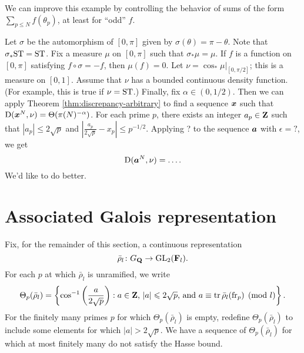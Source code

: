 We can improve this example by controlling the behavior of sums of the form 
$\sum_{p\leqslant N} f(\theta_p)$, at least for ``odd'' $f$. 

Let $\sigma$ be the automorphism of $[0,\pi]$ given by 
$\sigma(\theta) = \pi-\theta$. Note that $\sigma_\ast \mathrm{ST} = \mathrm{ST}$. 
Fix a measure $\mu$ on $[0,\pi]$ such that $\sigma_\ast \mu = \mu$. If $f$ is a 
function on $[0,\pi]$ satisfying $f\circ \sigma = - f$, then $\mu(f) = 0$. Let 
$\nu = \cos_\ast \left. \mu\right|_{[0,\pi/2]}$; this is a measure on $[0,1]$. 
Assume that $\nu$ has a bounded continuous density function. (For example, this 
is true if $\nu = \mathrm{ST}$.) Finally, fix $\alpha\in (0,1/2)$. Then we can apply 
Theorem \ref{thm:discrepancy-arbitrary} to find a sequence ${\boldsymbol x}$ such that 
$\operatorname{D}({\boldsymbol x}^N,\nu) = \Theta(\pi(N)^{-\alpha})$. For each prime $p$, there 
exists an integer $a_p\in \mathbf{Z}$ such that $|a_p| \leqslant 2\sqrt p$ and 
$\left| \frac{a_p}{2\sqrt p} - x_p\right| \leqslant p^{-1/2}$. Applying 
? to the sequence ${\boldsymbol a}$ with $\epsilon = ?$, we get 
\[
	\operatorname{D}({\boldsymbol a}^N,\nu) = \ldots .
\]
We'd like to do better. 





\section{Associated Galois representation}



Fix, for the remainder of this section, a continuous representation 
\[
	\bar\rho_l \colon G_{\mathbf{Q}} \to \operatorname{GL}_2(\mathbf{F}_l) .
\]
For each $p$ at which $\bar\rho_l$ is unramified, we write 
\[
	\Theta_p(\bar\rho_l) = \left\{\cos^{-1}\left(\frac{a}{2\sqrt p}\right) : a\in \mathbf{Z}\text{, }|a|\leqslant 2\sqrt p\text{, and }a\equiv \operatorname{tr}\bar\rho_l(\mathrm{fr}_p)\pmod l\right\} .
\]
For the finitely many primes $p$ for which $\Theta_p(\bar\rho_l)$ is empty, 
redefine $\Theta_p(\bar\rho_l)$ to include some elements for which 
$|a|>2\sqrt p$. We have a sequence of $\Theta_p(\bar\rho_l)$ for which at most 
finitely many do not satisfy the Hasse bound. 

